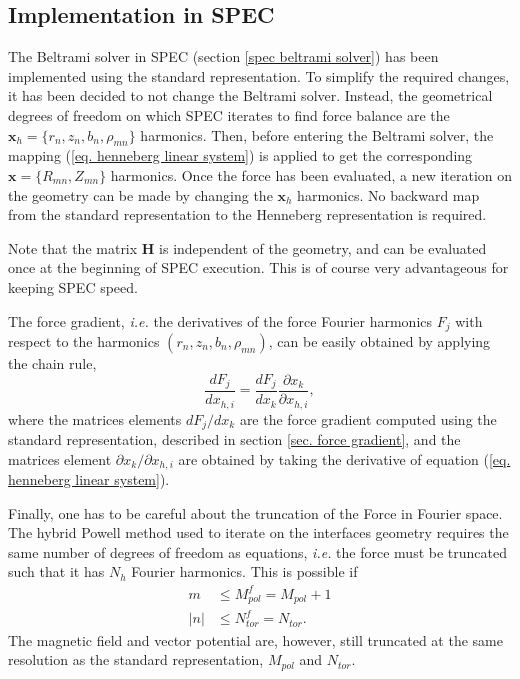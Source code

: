 \documentclass[my_thesis.tex]{subfiles}
\begin{document}
\subsection{Implementation in SPEC}
The Beltrami solver in SPEC (section \ref{spec beltrami solver}) has been implemented using the standard representation. To simplify the required changes, it has been decided to not change the Beltrami solver. Instead, the geometrical degrees of freedom on which SPEC iterates to find force balance are the $\mathbf{x}_h=\{r_n,z_n,b_n,\rho_{mn}\}$ harmonics. Then, before entering the Beltrami solver, the mapping (\ref{eq. henneberg linear system}) is applied to get the corresponding $\mathbf{x}=\{R_{mn},Z_{mn}\}$ harmonics. Once the force has been evaluated, a new iteration on the geometry can be made by changing the $\mathbf{x}_h$ harmonics. No backward map from the standard representation to the Henneberg representation is required.

Note that the matrix $\mathbf{H}$ is independent of the geometry, and can be evaluated once at the beginning of SPEC execution. This is of course very advantageous for keeping SPEC speed.

The force gradient, \textit{i.e.} the derivatives of the force Fourier harmonics $F_j$ with respect to the harmonics $(r_n,z_n,b_n,\rho_{mn})$, can be easily obtained by applying the chain rule,
\begin{equation}
	\frac{dF_j}{dx_{h,i}} = \frac{dF_j}{dx_k}\frac{\partial x_k}{\partial x_{h,i}},
\end{equation}
where the matrices elements $dF_j/dx_k$ are the force gradient computed using the standard representation, described in section \ref{sec. force gradient}, and the matrices element $\partial x_k/\partial x_{h,i}$ are obtained by taking the derivative of equation (\ref{eq. henneberg linear system}).

Finally, one has to be careful about the truncation of the Force in Fourier space. The hybrid Powell method used to iterate on the interfaces geometry requires the same number of degrees of freedom as equations, \textit{i.e.} the force must be truncated such that it has $N_h$ Fourier harmonics. This is possible if 
\begin{align}
	m&\leq M^f_{pol}= M_{pol}+1\label{eq.poloidal force truncation}\\ 
	|n|&\leq N^f_{tor}= N_{tor}.\label{eq.toroidal force truncation}
\end{align}
The magnetic field and vector potential are, however, still truncated at the same resolution as the standard representation, $M_{pol}$ and $N_{tor}$.
\end{document}
